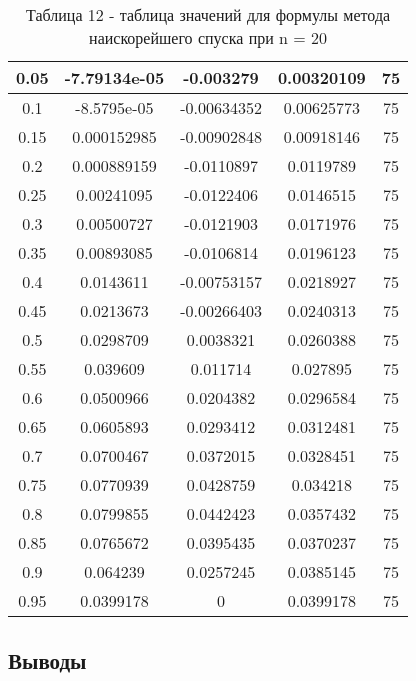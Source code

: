 \documentclass[a4paper,12pt]{article}
\begin{document}
\begin{enumerate}[label = \arabic*.]
{\begin{table}[h]
\begin{tabular}{|c|c|c|c|c|}
      0.05 & -7.79134e-05 &    -0.003279 &   0.00320109 & 75\\ \hline
      0.1 &  -8.5795e-05 &  -0.00634352 &   0.00625773 & 75\\ \hline
      0.15 &  0.000152985 &  -0.00902848 &   0.00918146 & 75\\ \hline
      0.2 &  0.000889159 &   -0.0110897 &    0.0119789 & 75\\ \hline
      0.25 &   0.00241095 &   -0.0122406 &    0.0146515 & 75\\ \hline
      0.3 &   0.00500727 &   -0.0121903 &    0.0171976 & 75\\ \hline
      0.35 &   0.00893085 &   -0.0106814 &    0.0196123 & 75\\ \hline
      0.4 &    0.0143611 &  -0.00753157 &    0.0218927 & 75\\ \hline
      0.45 &    0.0213673 &  -0.00266403 &    0.0240313 & 75\\ \hline
      0.5 &    0.0298709 &    0.0038321 &    0.0260388 & 75\\ \hline
      0.55 &     0.039609 &     0.011714 &     0.027895 & 75\\ \hline
      0.6 &    0.0500966 &    0.0204382 &    0.0296584 & 75\\ \hline
      0.65 &    0.0605893 &    0.0293412 &    0.0312481 & 75\\ \hline
      0.7 &    0.0700467 &    0.0372015 &    0.0328451 & 75\\ \hline
      0.75 &    0.0770939 &    0.0428759 &     0.034218 & 75\\ \hline
      0.8 &    0.0799855 &    0.0442423 &    0.0357432 & 75\\ \hline
      0.85 &    0.0765672 &    0.0395435 &    0.0370237 & 75\\ \hline
      0.9 &     0.064239 &    0.0257245 &    0.0385145 & 75\\ \hline
      0.95 &    0.0399178 &            0 &    0.0399178 & 75\\ \hline
      \end{tabular}
      \caption*{\small{Таблица 12 - таблица значений для формулы метода наискорейшего спуска при n = 20}}
    \end{table}
  }
\end{enumerate}
\newpage

\begin{center}
\section{Выводы}
\end{center}
\end{document}
